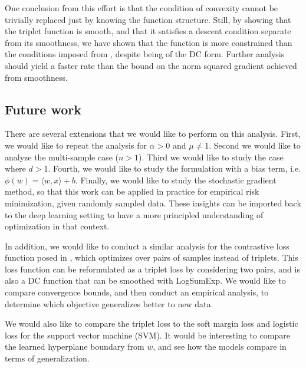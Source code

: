 \documentclass[11pt]{article}
\begin{document}
One conclusion from this effort is that the condition of convexity cannot be trivially replaced just by knowing the function structure. Still, by showing that the triplet function is smooth, and that it satisfies a descent condition separate from its smoothness, we have shown that the function is more constrained than the conditions imposed from \cite{khamaru_convergence_2018}, despite being of the DC form. Further analysis should yield a faster rate than the bound on the norm squared gradient achieved from smoothness.

\subsection{Future work}

There are several extensions that we would like to perform on this analysis. First, we would like to repeat the analysis for $\alpha > 0$ and $\mu \neq 1$. Second we would like to analyze the multi-sample case ($n > 1$). Third we would like to study the case where $d > 1$. Fourth, we would like to study the formulation with a bias term, i.e. $\phi(w) = \langle w, x \rangle + b$. Finally, we would like to study the stochastic gradient method, so that this work can be applied in practice for empirical risk minimization, given randomly sampled data. These insights can be imported back to the deep learning setting to have a more principled understanding of optimization in that context.

In addition, we would like to conduct a similar analysis for the contrastive loss function posed in \cite{hadsell_dimensionality_2006}, which optimizes over pairs of samples instead of triplets. This loss function can be reformulated as a triplet loss by considering two pairs, and is also a DC function that can be smoothed with LogSumExp. We would like to compare convergence bounds, and then conduct an empirical analysis, to determine which objective generalizes better to new data.

We would also like to compare the triplet loss to the soft margin loss and logistic loss for the support vector machine (SVM). It would be interesting to compare the learned hyperplane boundary from $w$, and see how the models compare in terms of generalization.

\end{document}

